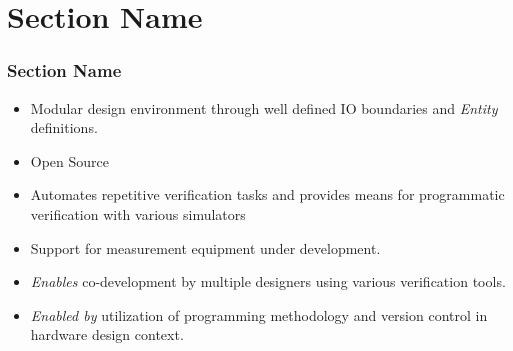 \documentclass{sdkslides}
\newcommand{\sectname}{Section Name}
\begin{document}
\section{\sectname}
\begin{frame}[t]
    \frametitle{\sectname}
    \begin{itemize}
        \item Modular design environment through well defined IO boundaries and
            \emph{Entity} definitions.
        \item Open Source
        \item Automates repetitive verification tasks and provides means for programmatic
            verification with various simulators
        \item Support for measurement equipment under development.
        \item \emph{Enables} co-development by multiple designers using various
            verification tools.
        \item \emph{Enabled by} utilization of programming methodology and
            version control in hardware design context.
    \end{itemize}
\end{frame}
\end{document}
